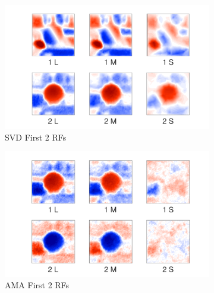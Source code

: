 \documentclass{jov}
\begin{document}
\begin{figure}
\centering
\begin{subfigure}[b]{0.27 \textwidth}
		\centering
        \includegraphics[width=\textwidth]{Figure6/case10SVD.pdf}
        \caption{SVD First 2 RFs}
        \label{fig:case10SVD}
    \end{subfigure}
    \begin{subfigure}[b]{0.27 \textwidth}   
        \includegraphics[width=\textwidth]{Figure6/case10AMA.pdf}
        \caption{AMA First 2 RFs}
        \label{fig:case10AMA}
    \end{subfigure}
        \begin{subfigure}[b]{0.20 \textwidth}

\end{subfigure}
\end{figure}
\end{document}
